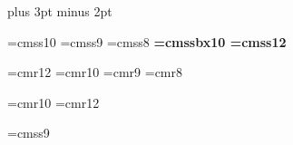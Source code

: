 \textheight 10.90in
\textwidth 7.95in
\parskip 8pt plus 3pt minus 2pt
\parindent 0in
\pagestyle{empty}			


\font\sf=cmss10
\font\small=cmss9
\font\tiny=cmss8
\font\bf=cmssbx10
\font\large=cmss12

\font\frL=cmr12
\font\frn=cmr10
\font\frs=cmr9
\font\frt=cmr8

\font\ajfrn=cmr10
\font\ajfrL=cmr12


\font\ajinpfont=cmss9

\newcommand{\ajnull}{\makebox[0.05in]{\phantom{a}}}


       

\newcommand{\atiny}{\tiny \setlength{\baselineskip}{2.0mm}}

\newcommand{\ajubox}[1]{\raisebox{0.045in}{\phantom{M}\hspace*{-1.0em}
                          \rule[-0.05in]{0.3pt}{0.05in}
                          \hspace*{-1.1mm}\rule[-0.05in]{#1}{0.3pt}
                          \hspace*{-1.1mm}\rule[-0.05in]{0.3pt}{0.05in}}}

\newcommand{\ajudot}[1]{\phantom{M}\hspace*{-1.0em}\parbox[b]{#1}{
                          {.}\dotfill{.}}}

\newcommand{\tline}{\rule[0.0cm]{18.5cm}{0.7mm}}

\newcommand{\fbt}[1]{\hspace*{#1}\raisebox{0.045in}{\atiny
                     \framebox[0.15in][c]{\ajnull}}}

\newcommand{\ajyn}{\large \setlength{\baselineskip}{2.3mm} Y/N}

\newcommand{\ajy}{\hspace*{0.19in}\rule[0.02in]{0.09in}{0.08in}}

\newcommand{\ajn}{\rule[0.02in]{0.09in}{0.08in}}

\newcommand{\ajyesno}{YES/NO}

\newcommand{\ajyes}{\hspace*{0.31in}\rule[0.02in]{0.13in}{0.06in}}

